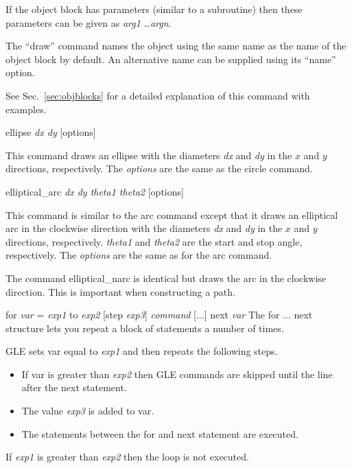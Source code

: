 \begin{commanddescription}
If the object block has parameters (similar to a subroutine) then these parameters can be given as {\it arg1} \ldots {\it argn}.

The ``draw'' command names the object using the same name as the name of the object block by default. An alternative name can be supplied using its ``name'' option.

See Sec.~\ref{sec:objblocks} for a detailed explanation of this command with examples.

\item[{\sf ellipse {\it dx dy} [options]}]

This command draws an ellipse with the diameters {\it dx} and {\it dy} in the $x$ and $y$ directions, respectively.  The {\it options} are the same as the {\sf circle} command.

\item[{\sf elliptical\_arc {\it dx dy theta1 theta2} [options]}]

This command is similar to the {\sf arc} command except that it draws an elliptical arc in the clockwise direction with the diameters  {\it dx} and  {\it dy} in the $x$ and $y$ directions, respectively. {\it theta1} and {\it theta2} are the start and stop angle, respectively.  The {\it options} are the same as for the {\sf arc} command.

The command {\sf elliptical\_narc} is identical but draws the arc in the clockwise direction.  This is important when constructing a path.

\item[{\sf for {\it var} = {\it exp1} to {\it exp2} [step {\it exp3}] {\it command} [...] next {\it var}}  ]
  
The {\sf for ... next} structure lets you repeat a block of statements
a number of times.

GLE sets {\sf var} equal to {\it exp1} and then repeats the following
steps.

\begin{itemize}
\item If {\sf var} is greater than {\it exp2} then GLE commands are skipped
until the line after the {\sf next} statement.
\item The value {\it exp3} is added to {\sf var}.
\item The statements between the {\sf for} and {\sf next} statement are executed.
\end{itemize}

If {\it exp1} is greater than {\it exp2} then the loop is not executed.


\end{commanddescription}
